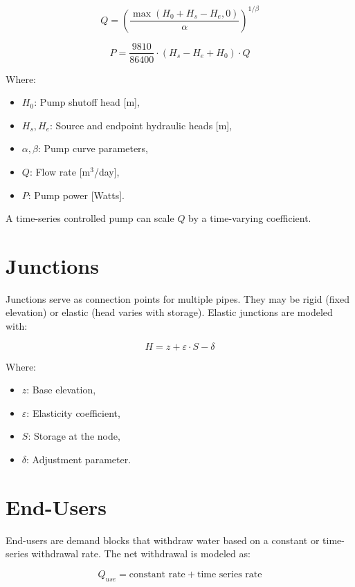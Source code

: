 \documentclass[12pt]{report}
\begin{document}
\begin{equation}
Q = \left(\frac{\max(H_0 + H_s - H_e, 0)}{\alpha}\right)^{1/\beta}
\end{equation}

\begin{equation}
P = \frac{9810}{86400} \cdot (H_s - H_e + H_0) \cdot Q
\end{equation}

Where:
\begin{itemize}
\item $H_0$: Pump shutoff head [m],
\item $H_s, H_e$: Source and endpoint hydraulic heads [m],
\item $\alpha, \beta$: Pump curve parameters,
\item $Q$: Flow rate [m$^3$/day],
\item $P$: Pump power [Watts].
\end{itemize}

A time-series controlled pump can scale $Q$ by a time-varying coefficient.

\section{Junctions}
Junctions serve as connection points for multiple pipes. They may be rigid (fixed elevation) or elastic (head varies with storage). Elastic junctions are modeled with:

\begin{equation}
H = z + \varepsilon \cdot S - \delta
\end{equation}

Where:
\begin{itemize}
\item $z$: Base elevation,
\item $\varepsilon$: Elasticity coefficient,
\item $S$: Storage at the node,
\item $\delta$: Adjustment parameter.
\end{itemize}

\section{End-Users}
End-users are demand blocks that withdraw water based on a constant or time-series withdrawal rate. The net withdrawal is modeled as:

\begin{equation}
Q_{use} = \textrm{constant rate} + \textrm{time series rate}
\end{equation}
\end{document}

